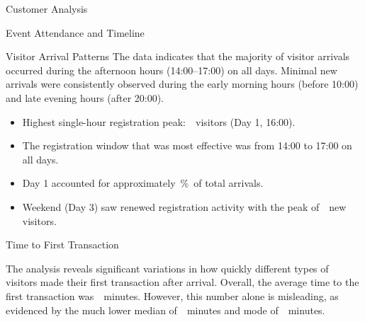 \begin{section}{Customer Analysis}
\begin{subsection}{Event Attendance and Timeline}
\begin{subsubsection}{Visitor Arrival Patterns}
			The data indicates that the majority of visitor arrivals occurred during the afternoon hours (14:00–17:00) on all days.
			Minimal new arrivals were consistently observed during the early morning hours (before 10:00) and late evening hours (after 20:00).

			\begin{keytakeaways}
				\begin{itemize}
					\item Highest single-hour registration peak:~~visitors (Day 1, 16:00).
					\item The registration window that was most effective was from 14:00 to 17:00 on all days.
					\item Day 1 accounted for approximately~\%~of total arrivals.
					\item Weekend (Day 3) saw renewed registration activity with the peak of~~new visitors.
				\end{itemize}
			\end{keytakeaways}
		\end{subsubsection}

		\begin{subsubsection}{Time to First Transaction}
			\label{subsubsec:analysis-first-transaction}


			The analysis reveals significant variations in how quickly different types of visitors made their first transaction after arrival.
			Overall, the average time to the first transaction was~~minutes.
			However, this number alone is misleading, as evidenced by the much lower median of~~minutes and mode of~~minutes.


\end{subsubsection}
\end{subsection}
\end{section}
